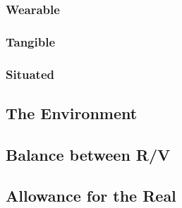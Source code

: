 \subsubsection{Wearable}
\subsubsection{Tangible}
\subsubsection{Situated}

\subsection{The Environment}
\subsection{Balance between R/V}
\subsection{Allowance for the Real}

